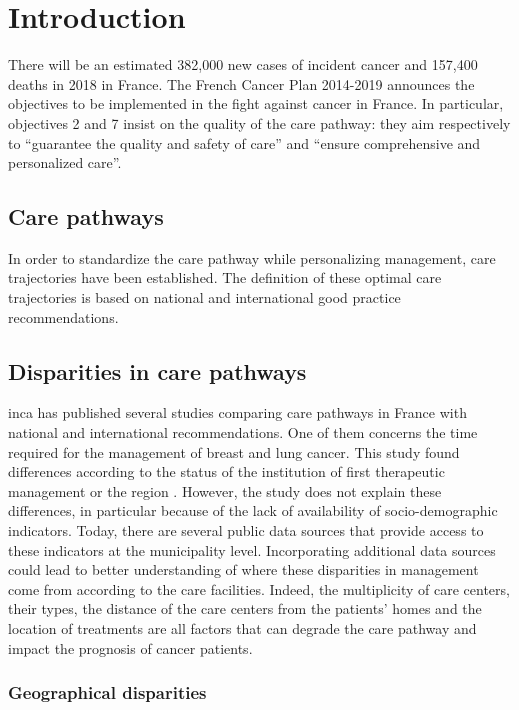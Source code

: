 \chapter{Introduction}

There will be an estimated 382,000 new cases of incident cancer and 157,400
deaths in 2018 in France. The French Cancer Plan \cite{buzyn_plan_2014}
2014-2019 announces the objectives to be implemented in the fight against cancer
in France. In particular, objectives 2 and 7 insist on the quality of the care
pathway: they aim respectively to ``guarantee the quality and safety of care''
and ``ensure comprehensive and personalized care''.

\section{Care pathways}

In order to standardize the care pathway while personalizing management, care
trajectories have been established. The definition of these optimal care
trajectories is based on national and international good practice
recommendations.

\section{Disparities in care pathways}

\ac{inca} has published several studies comparing care pathways in France with
national and international recommendations. One of them concerns the time
required for the management of breast and lung cancer. This study found
differences according to the status of the institution of first therapeutic
management or the region \cite{bernard_ledesert_etude_2012}. However, the study
does not explain these differences, in particular because of the lack of
availability of socio-demographic indicators. Today, there are several public
data sources that provide access to these indicators at the municipality level.
Incorporating additional data sources could lead to better understanding of
where these disparities in management come from according to the care
facilities. Indeed, the multiplicity of care centers, their types, the distance
of the care centers from the patients' homes and the location of treatments are
all factors that can degrade the care pathway and impact the prognosis of cancer
patients.

\subsection*{Geographical disparities}

